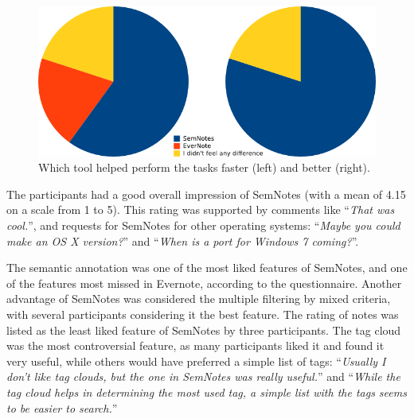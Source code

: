 \begin{figure}[htb]
 \includegraphics[width=0.7\linewidth]{chapters/core/img/fasterbetter}
\caption{Which tool helped perform the tasks faster (left) and better (right).}
\label{fig:betterfaster}
\end{figure}

The participants had a good overall impression of SemNotes (with a mean of 4.15 on a scale from 1 to 5). This rating was supported by comments like ``\emph{That was cool.}'', and requests for SemNotes for other operating systems: ``\emph{Maybe you could make an OS X version?}'' and ``\emph{When is a port for Windows 7 coming?}''.

The semantic annotation was one of the most liked features of SemNotes, and one of the features most missed in Evernote, according to the questionnaire. Another advantage of SemNotes was considered the multiple filtering by mixed criteria, with several participants considering it the best feature. The rating of notes was listed as the least liked feature of SemNotes by three participants. The tag cloud was the most controversial feature, as many participants liked it and found it very useful, while others would have preferred a simple list of tags: ``\emph{Usually I don't like tag clouds, but the one in SemNotes was really useful.}'' and ``\emph{While the tag cloud helps in determining the most used tag, a simple list with the tags seems to be easier to search.}'' 
